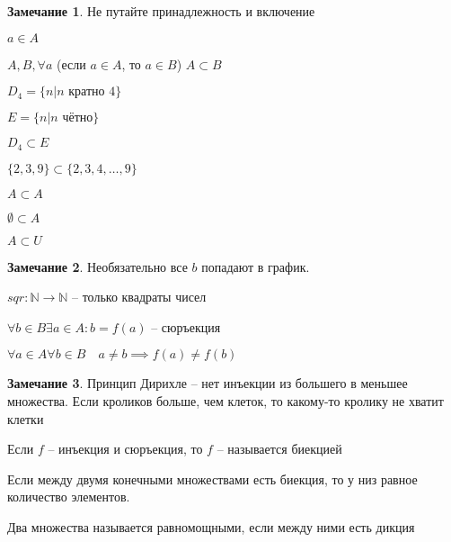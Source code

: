 \documentclass{book}
\newcommand\N{\ensuremath{\mathbb{N}}}
\renewcommand\O{\ensuremath{\emptyset}}
\theoremstyle{definition}
\newtheorem*{note}{Замечание}
\begin{document}
        \begin{note}
            Не путайте принадлежность и включение

            $a\in A$

            $A, B, \forall a$ (если $a\in A$, то $a\in B$) $A\subset B$

            $D_4 = \{n|n\text{ кратно } 4\}$

            $E = \{n|n\text{ чётно}\}$

            $D_4\subset E$

            $\{2, 3, 9\} \subset  \{2, 3, 4, \ldots, 9\}$

            $A\subset A$

            $\O \subset A$

            $A\subset U$
        \end{note}

        \begin{note}
            Необязательно все $b$ попадают в график.
            
            $sqr:\N \to \N $ -- только квадраты чисел
        \end{note}

        \begin{definition}
            $\forall b\in B\exists a\in A: b = f(a)$ -- сюръекция
        \end{definition}

        \begin{definition}
            $\forall a\in A \forall b\in B\quad a\neq b \implies f(a)\neq f(b)$
        \end{definition}

        \begin{note}
            Принцип Дирихле -- нет инъекции из большего в меньшее множества. Если кроликов больше, чем клеток, то какому-то кролику не хватит клетки
        \end{note}

        \begin{definition}
            Если $f$ -- инъекция и сюръекция, то $f$ -- называется биекцией

            Если между двумя конечными множествами есть биекция, то у низ равное количество элементов.
        \end{definition}

        \begin{definition}
            Два множества называется равномощными, если между ними есть дикция
        \end{definition}
\end{document}

